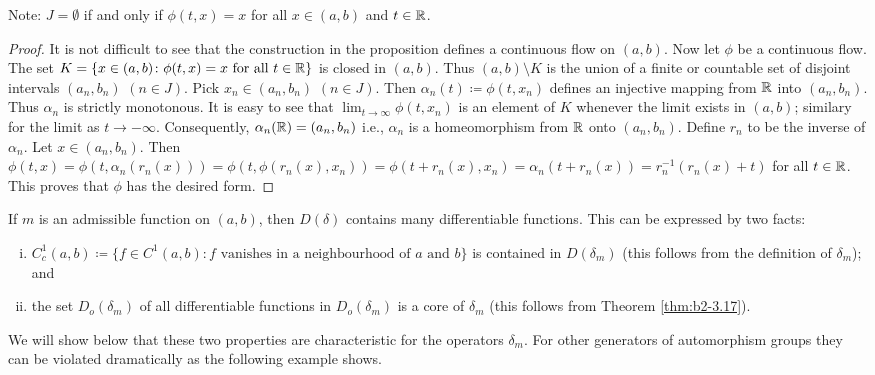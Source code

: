 Note: $J = \emptyset$ if and only if $\phi(t,x) = x$ for all $x \in (a,b)$ and $t \in \mathbb{R}$.
\begin{proof}
It is not difficult to see that the construction in the proposition defines a continuous flow on $(a,b)$.
Now let $\phi$ be a continuous flow.
The set $K = \{ x \in (a,b) \colon \phi(t,x) = x \text{ for all } t \in \mathbb{R} \}$ is closed in $(a,b)$.
Thus $(a,b) \setminus K$ is the union of a finite or countable set of disjoint intervals $(a_{n},b_{n})$ $(n \in J)$.
Pick $x_{n} \in (a_{n},b_{n})$ $(n \in J)$.
Then $\alpha_{n}(t) \coloneqq \phi(t,x_{n})$ defines an injective mapping from $\mathbb{R}$ into $(a_{n},b_{n})$.
Thus $\alpha_{n}$ is strictly monotonous.
It is easy to see that $\lim_{t \to \infty} \phi(t,x_{n})$ is an element of $K$ whenever the limit exists in $(a,b)$; similary for the limit as $t \to -\infty$.
Consequently, $\alpha_{n}(\mathbb{R}) = (a_{n},b_{n})$ i.e., $\alpha_{n}$ is a homeomorphism from $\mathbb{R}$ onto $(a_{n},b_{n})$.
Define $r_{n}$ to be the inverse of $\alpha_{n}$.
Let $x \in (a_{n},b_{n})$.
Then $\phi(t,x) = \phi(t, \alpha_{n}(r_{n}(x))) = \phi(t, \phi(r_{n}(x),x_{n})) = \phi(t + r_{n}(x),x_{n}) = \alpha_{n}(t + r_{n}(x)) = r_{n}^{-1}(r_{n}(x) + t)$ for all $t \in \mathbb{R}$.
This proves that $\phi$ has the desired form.
\end{proof}
If $m$ is an admissible function on $(a,b)$, then $D(\delta)$ contains many differentiable functions.
This can be expressed by two facts:
\begin{enumerate}[(i)]
\item \label{enum:b2-3-1.1}
$C_{c}^{1}(a,b) \coloneqq \{ f \in C^{1}(a,b) \colon f \text{ vanishes in a neighbourhood of } a \text{ and } b\}$ is contained in $D(\delta_{m})$ (this follows from the definition of $\delta_{m}$); and
\item  \label{enum:b2-3-1.2}
the set $D_{o}(\delta_{m})$ of all differentiable functions in $D_{o}(\delta_{m})$ is a core of $\delta_{m}$ (this follows from Theorem \ref{thm:b2-3.17}).
\end{enumerate}
We will show below that these two properties are characteristic for the operators $\delta_{m}$.
For other generators of automorphism groups they can be violated dramatically as the following example shows.
